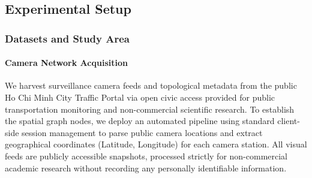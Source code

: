 \documentclass[a4paper,fleqn]{cas-sc}
\begin{document}


\subsection{Experimental Setup}

\subsubsection{Datasets and Study Area}
\label{sec:datasets}

\paragraph{Camera Network Acquisition}
We harvest surveillance camera feeds and topological metadata from the public Ho Chi Minh City Traffic Portal via open civic access provided for public transportation monitoring and non-commercial scientific research. To establish the spatial graph nodes, we deploy an automated pipeline using standard client-side session management to parse public camera locations and extract geographical coordinates (Latitude, Longitude) for each camera station. All visual feeds are publicly accessible snapshots, processed strictly for non-commercial academic research without recording any personally identifiable information. 
\end{document}
